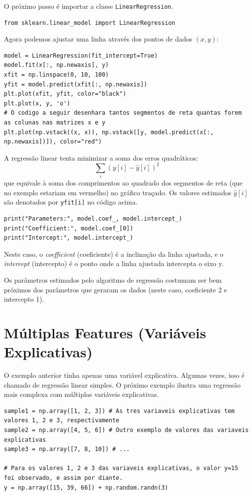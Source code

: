 \documentclass[11pt,a4paper]{article}
\begin{document}
O próximo passo é importar a classe \texttt{LinearRegression}.
\begin{lstlisting}
from sklearn.linear_model import LinearRegression
\end{lstlisting}

Agora podemos ajustar uma linha através dos pontos de dados $(x, y)$:
\begin{lstlisting}
model = LinearRegression(fit_intercept=True)
model.fit(x[:, np.newaxis], y)
xfit = np.linspace(0, 10, 100)
yfit = model.predict(xfit[:, np.newaxis])
plt.plot(xfit, yfit, color="black")
plt.plot(x, y, 'o')
# O codigo a seguir desenhara tantos segmentos de reta quantas forem as colunas nas matrizes x e y
plt.plot(np.vstack((x, x)), np.vstack([y, model.predict(x[:, np.newaxis])]), color="red")
\end{lstlisting}

A regressão linear tenta minimizar a soma dos erros quadráticos:
\[ \sum_{i}(y[i]-\hat{y}[i])^{2} \]
que equivale à soma dos comprimentos ao quadrado dos segmentos de reta (que no exemplo estariam em vermelho) no gráfico traçado. Os valores estimados $\hat{y}[i]$ são denotados por \texttt{yfit[i]} no código acima.

\begin{lstlisting}
print("Parameters:", model.coef_, model.intercept_)
print("Coefficient:", model.coef_[0])
print("Intercept:", model.intercept_)
\end{lstlisting}

Neste caso, o \textit{coefficient} (coeficiente) é a inclinação da linha ajustada, e o \textit{intercept} (intercepto) é o ponto onde a linha ajustada intercepta o eixo y.

Os parâmetros estimados pelo algoritmo de regressão costumam ser bem próximos dos parâmetros que geraram os dados (neste caso, coeficiente 2 e intercepto 1). 

\section{Múltiplas Features (Variáveis Explicativas)}

O exemplo anterior tinha apenas uma variável explicativa. Algumas vezes, isso é chamado de regressão linear simples. O próximo exemplo ilustra uma regressão mais complexa com múltiplas variáveis explicativas.

\begin{lstlisting}
sample1 = np.array([1, 2, 3]) # As tres variaveis explicativas tem valores 1, 2 e 3, respectivamente
sample2 = np.array([4, 5, 6]) # Outro exemplo de valores das variaveis explicativas
sample3 = np.array([7, 8, 10]) # ...

# Para os valores 1, 2 e 3 das variaveis explicativas, o valor y=15 foi observado, e assim por diante.
y = np.array([15, 39, 66]) + np.random.randn(3)
\end{lstlisting}
\end{document}
